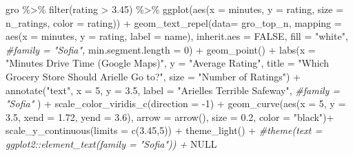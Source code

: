 \documentclass[]{tufte-handout}
\newenvironment{Shaded}{}{}
\newcommand{\AttributeTok}[1]{\textcolor[rgb]{0.49,0.56,0.16}{#1}}
\newcommand{\CommentTok}[1]{\textcolor[rgb]{0.38,0.63,0.69}{\textit{#1}}}
\newcommand{\ConstantTok}[1]{\textcolor[rgb]{0.53,0.00,0.00}{#1}}
\newcommand{\DecValTok}[1]{\textcolor[rgb]{0.25,0.63,0.44}{#1}}
\newcommand{\FloatTok}[1]{\textcolor[rgb]{0.25,0.63,0.44}{#1}}
\newcommand{\FunctionTok}[1]{\textcolor[rgb]{0.02,0.16,0.49}{#1}}
\newcommand{\NormalTok}[1]{#1}
\newcommand{\SpecialCharTok}[1]{\textcolor[rgb]{0.25,0.44,0.63}{#1}}
\newcommand{\StringTok}[1]{\textcolor[rgb]{0.25,0.44,0.63}{#1}}
\begin{document}
\begin{Shaded}
\begin{Highlighting}[]
\NormalTok{gro }\SpecialCharTok{\%\textgreater{}\%} 
  \FunctionTok{filter}\NormalTok{(rating }\SpecialCharTok{\textgreater{}} \FloatTok{3.45}\NormalTok{) }\SpecialCharTok{\%\textgreater{}\%} 
  \FunctionTok{ggplot}\NormalTok{(}\FunctionTok{aes}\NormalTok{(}\AttributeTok{x =}\NormalTok{ minutes, }\AttributeTok{y =}\NormalTok{ rating, }\AttributeTok{size =}\NormalTok{ n\_ratings, }\AttributeTok{color =}\NormalTok{ rating)) }\SpecialCharTok{+}
  \FunctionTok{geom\_text\_repel}\NormalTok{(}\AttributeTok{data=}\NormalTok{ gro\_top\_n, }
            \AttributeTok{mapping =} \FunctionTok{aes}\NormalTok{(}\AttributeTok{x =}\NormalTok{ minutes, }\AttributeTok{y =}\NormalTok{ rating, }\AttributeTok{label =}\NormalTok{ name), }
            \AttributeTok{inherit.aes =} \ConstantTok{FALSE}\NormalTok{, }
            \AttributeTok{fill =} \StringTok{"white"}\NormalTok{,}
            \CommentTok{\#family = "Sofia",}
            \AttributeTok{min.segment.length =} \DecValTok{0}\NormalTok{) }\SpecialCharTok{+}
  \FunctionTok{geom\_point}\NormalTok{() }\SpecialCharTok{+}
  \FunctionTok{labs}\NormalTok{(}\AttributeTok{x =} \StringTok{"Minutes Drive Time (Google Maps)"}\NormalTok{,}
       \AttributeTok{y =} \StringTok{"Average Rating"}\NormalTok{, }
       \AttributeTok{title =} \StringTok{"Which Grocery Store Should Arielle Go to?"}\NormalTok{, }
       \AttributeTok{size =} \StringTok{"Number of Ratings"}\NormalTok{) }\SpecialCharTok{+} 
  \FunctionTok{annotate}\NormalTok{(}\StringTok{"text"}\NormalTok{, }\AttributeTok{x =} \DecValTok{5}\NormalTok{, }\AttributeTok{y =} \FloatTok{3.5}\NormalTok{, }\AttributeTok{label =} \StringTok{"Arielle\textquotesingle{}s Terrible Safeway"}\NormalTok{, }
           \CommentTok{\#family = "Sofia"}
\NormalTok{           ) }\SpecialCharTok{+} 
  \FunctionTok{scale\_color\_viridis\_c}\NormalTok{(}\AttributeTok{direction =} \SpecialCharTok{{-}}\DecValTok{1}\NormalTok{) }\SpecialCharTok{+} 
  \FunctionTok{geom\_curve}\NormalTok{(}\FunctionTok{aes}\NormalTok{(}\AttributeTok{x =} \DecValTok{5}\NormalTok{, }\AttributeTok{y =}  \FloatTok{3.5}\NormalTok{, }\AttributeTok{xend =} \FloatTok{1.72}\NormalTok{, }\AttributeTok{yend =}  \FloatTok{3.6}\NormalTok{),}
             \AttributeTok{arrow =} \FunctionTok{arrow}\NormalTok{(), }\AttributeTok{size =} \FloatTok{0.2}\NormalTok{, }\AttributeTok{color =} \StringTok{"black"}\NormalTok{)}\SpecialCharTok{+} 
  \FunctionTok{scale\_y\_continuous}\NormalTok{(}\AttributeTok{limits =} \FunctionTok{c}\NormalTok{(}\FloatTok{3.45}\NormalTok{,}\DecValTok{5}\NormalTok{)) }\SpecialCharTok{+} 
  \FunctionTok{theme\_light}\NormalTok{() }\SpecialCharTok{+} 
  \CommentTok{\#theme(text = ggplot2::element\_text(family = "Sofia")) +}
  \ConstantTok{NULL}
\end{Highlighting}
\end{Shaded}
\end{document}
